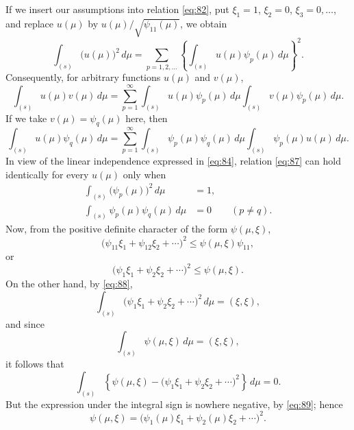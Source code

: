\documentclass[b5paper,twoside]{article}
\newcommand{\originalpage}[1]{\phantomsection\label{origpage:#1}}
\begin{document}
If we insert our assumptions into relation \eqref{eq:82}, put
$\xi_1=1$, $\xi_2=0$, $\xi_3=0,\ldots$, and replace $u(\mu)$ by
$u(\mu)/\sqrt{\psi_{11}(\mu)}$, we obtain
\begin{equation}
  \int_{(s)}\bigl(u(\mu)\bigr)^2\,d\mu
  =\sum_{p=1,2,\ldots}
  \left\{\int_{(s)}u(\mu)\psi_p(\mu)\,d\mu\right\}^{\!2}.
  \tag{85}\label{eq:85}
\end{equation}
Consequently, for arbitrary functions $u(\mu)$ and $v(\mu)$,
\begin{equation}
  \int_{(s)}u(\mu)v(\mu)\,d\mu
  =\sum_{p=1}^{\infty}
  \int_{(s)}u(\mu)\psi_p(\mu)\,d\mu
  \int_{(s)}v(\mu)\psi_p(\mu)\,d\mu.
  \tag{86}\label{eq:86}
\end{equation}
If we take $v(\mu)=\psi_q(\mu)$ here, then
\begin{equation}
  \int_{(s)}u(\mu)\psi_q(\mu)\,d\mu
  =\sum_{p=1}^{\infty}
  \int_{(s)}\psi_p(\mu)\psi_q(\mu)\,d\mu
  \int_{(s)}\psi_p(\mu)u(\mu)\,d\mu.
  \tag{87}\label{eq:87}
\end{equation}
In view of the linear independence expressed in \eqref{eq:84}, relation
\eqref{eq:87} can hold identically for every $u(\mu)$ only when
\originalpage{207}
\begin{align}
  \int_{(s)}\bigl(\psi_p(\mu)\bigr)^2\,d\mu&=1,
  \nonumber\\
  \int_{(s)}\psi_p(\mu)\psi_q(\mu)\,d\mu&=0\qquad(p\ne q).
  \tag{88}\label{eq:88}
\end{align}
Now, from the positive definite character of the form $\psi(\mu,\xi)$,
\[
  \bigl(\psi_{11}\xi_1+\psi_{12}\xi_2+\cdots\bigr)^2
  \leq \psi(\mu,\xi)\psi_{11},
\]
or
\begin{equation}
  \bigl(\psi_1\xi_1+\psi_2\xi_2+\cdots\bigr)^2
  \leq \psi(\mu,\xi).
  \tag{89}\label{eq:89}
\end{equation}
On the other hand, by \eqref{eq:88},
\[
  \int_{(s)}
  \bigl(\psi_1\xi_1+\psi_2\xi_2+\cdots\bigr)^2\,d\mu
  =(\xi,\xi),
\]
and since
\[
  \int_{(s)}\psi(\mu,\xi)\,d\mu=(\xi,\xi),
\]
it follows that
\[
  \int_{(s)}
  \left\{
    \psi(\mu,\xi)
    -\bigl(\psi_1\xi_1+\psi_2\xi_2+\cdots\bigr)^2
  \right\}\,d\mu=0.
\]
But the expression under the integral sign is nowhere negative, by
\eqref{eq:89}; hence
\[
  \psi(\mu,\xi)
  =\bigl(\psi_1(\mu)\xi_1+\psi_2(\mu)\xi_2+\cdots\bigr)^2.
\]
\end{document}
